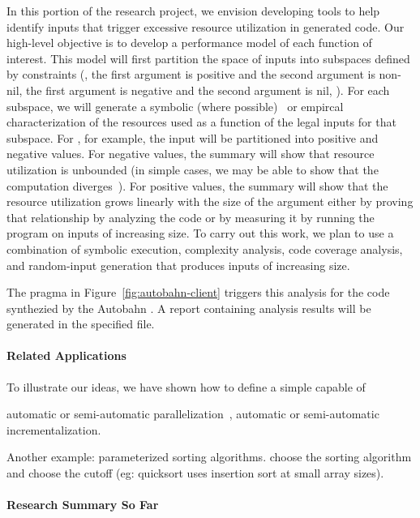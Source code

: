 In this portion of the \rasp{} research project, we envision
developing tools to help identify inputs that trigger excessive
resource utilization in generated code. 
Our high-level objective is to develop a performance model of each
function of interest.   This model will first partition the space of inputs into
subspaces defined by constraints (\eg{}, the first argument is 
positive and the second argument is non-nil, the first argument is
negative and the second argument is nil, \etc{}).  For each subspace,
we will generate a symbolic (where possible)~\cite{Hoffmann17} or
empircal~\cite{Goldsmith07} 
characterization of the resources used as a function of the legal
inputs for that subspace.   For , for example, the input
will be partitioned into positive and negative values.  For negative
values, the summary will show that resource utilization is unbounded
(in simple cases, we may be able to show that the computation 
diverges~\cite{Gupta08}).
For positive values, the summary will show that the resource
utilization grows linearly with the size of the argument either by
proving that relationship by analyzing the code or by measuring it by
running the program on inputs of increasing size.
To carry out this work, we plan to use a combination of symbolic
execution, complexity analysis, code coverage analysis, and 
random-input generation that produces inputs of increasing size. 


The  pragma in Figure~\ref{fig:autobahn-client}
triggers this analysis for the code synthezied by the Autobahn \rasp{}.
A report containing analysis results will be generated in the
specified file.

\paragraph*{Related Applications}
To illustrate our ideas, we have shown how to define a simple \rasp capable of

automatic or semi-automatic parallelization~\cite{implicit-parallelism}, automatic or semi-automatic incrementalization.

Another example:  parameterized sorting algorithms.  choose the sorting algorithm and choose the cutoff
(eg: quicksort uses insertion sort at small array sizes).

\paragraph*{Research Summary So Far}



